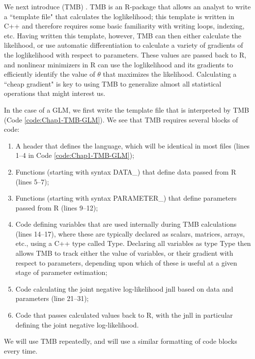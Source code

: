 We next introduce  (TMB) \cite{kristensen_tmb_2016}.  TMB is an R-package that allows an analyst to write a ``template file" that calculates the loglikelihood; this template is written in C++ and therefore requires some basic familiarity with writing loops, indexing, etc.  Having written this template, however, TMB can then either calculate the likelihood, or use automatic differentiation to calculate a variety of gradients of the loglikelihood with respect to parameters. These values are passed back to R, and nonlinear minimizers in R can use the loglikelihood and its gradients to efficiently identify the value of \( \theta \) that maximizes the likelihood.  Calculating a ``cheap gradient" is key to using TMB to generalize almost all statistical operations that might interest us.  

\lstset{style=TMBcode}


In the case of a GLM, we first write the template file that is interpreted by TMB (Code \ref{code:Chap1-TMB-GLM}).  We see that TMB requires several blocks of code:
\begin{enumerate}
    \item A header that defines the language, which will be identical in most files (lines 1--4 in Code \ref{code:Chap1-TMB-GLM});

    \item Functions (starting with syntax \colorbox{backblue}{DATA\_}) that define data passed from R (lines 5--7);
    
    \item Functions (starting with syntax \colorbox{backblue}{PARAMETER\_}) that define parameters passed from R (lines 9--12);
    
    \item Code defining variables that are used internally during TMB calculations (lines 14--17), where these are typically declared as scalars, matrices, arrays, etc., using a C++ type called \colorbox{backblue}{Type}. Declaring all variables as type \colorbox{backblue}{Type} then allows TMB to track either the value of variables, or their gradient with respect to parameters, depending upon which of these is useful at a given stage of parameter estimation;
    
    \item Code calculating the joint negative log-likelihood \colorbox{backblue}{jnll} based on data and parameters (line 21--31);
    
    \item Code that passes calculated values back to R, with the \colorbox{backblue}{jnll} in particular defining the joint negative log-likelihood.
\end{enumerate}
We will use TMB repeatedly, and will use a similar formatting of code blocks every time.

